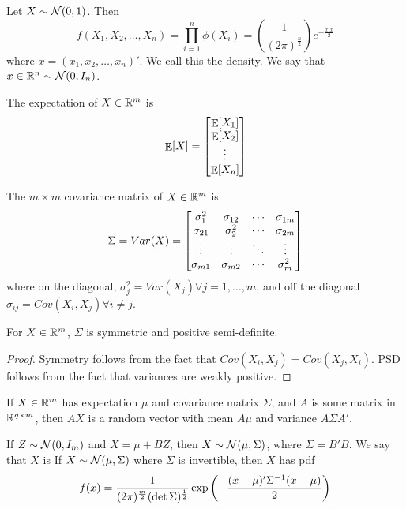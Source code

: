 \documentclass[10pt]{article}
\begin{document}
\begin{definition}

Let $X \sim \mathcal{N}(0,1)$. Then 
\[
f(X_1,X_2,\dots,X_n) = \prod_{i=1}^n \phi(X_i) = \left( \frac{1}{(2\pi)^{\frac{n}{2}}}\right) e^{-\frac{x'x}{2}}
\]
where $x = (x_1,x_2,\dots,x_n)'$. We call this the  density. We say that $x\in \mathbb{R}^n \sim \mathcal{N}(0,I_n)$.
\end{definition}

\begin{definition}
	The expectation of $X \in \mathbb{R}^m$ is
	\[
	\mathop{\mathbb{E}}[X] = \begin{bmatrix}\mathop{\mathbb{E}}[X_1] \\ \mathop{\mathbb{E}}[X_2] \\ \vdots \\ \mathop{\mathbb{E}}[X_n]\end{bmatrix}
	\]
\end{definition}

\begin{definition}
	The $m \times m$ covariance matrix of $X \in \mathbb{R}^m$ is
	\[
	\Sigma = Var(X) = \begin{bmatrix}\sigma_1^2 & \sigma_{12} & \cdots & \sigma_{1m} \\ \sigma_{21} & \sigma_2^2 & \cdots & \sigma_{2m} \\ \vdots & \vdots & \ddots & \vdots \\ \sigma_{m1} & \sigma_{m2} & \cdots &\sigma_m^2\end{bmatrix}
	\]
	where on the diagonal, $\sigma_j^2 = Var(X_j) \forall j = 1,\dots,m$, and off the diagonal $\sigma_{ij} = Cov(X_i,X_j) \forall i \ne j$.
\end{definition}

\begin{theorem}
	For $X \in \mathbb{R}^m$, $\Sigma$ is symmetric and positive semi-definite.
\end{theorem}

\begin{proof}
	Symmetry follows from the fact that $Cov(X_i,X_j) = Cov(X_j,X_i)$. PSD follows from the fact that variances are weakly positive.
\end{proof}

\begin{theorem}
	If $X \in \mathbb{R}^m$ has expectation $\mu$ and covariance matrix $\Sigma$, and $A$ is some matrix in $\mathbb{R}^{q \times m}$, then $AX$ is a random vector with mean $A\mu$ and variance $A \Sigma A'$.
\end{theorem}

\begin{definition}
	If $Z \sim \mathcal{N}(0,I_m)$ and $X = \mu + BZ$, then $X \sim \mathcal{N}(\mu,\Sigma)$, where $\Sigma = B'B$. We say that $X$ is  If $X \sim \mathcal{N}(\mu,\Sigma)$ where $\Sigma$ is invertible, then $X$ has pdf
	\[
	f(x) = \frac{1}{(2\pi)^{\frac{m}{2}}(\det \Sigma)^\frac{1}{2	}} \exp\left(- \frac{(x - \mu)' \Sigma^{-1} (x - \mu)}{2} \right)
	\]
\end{definition}
\end{document}
